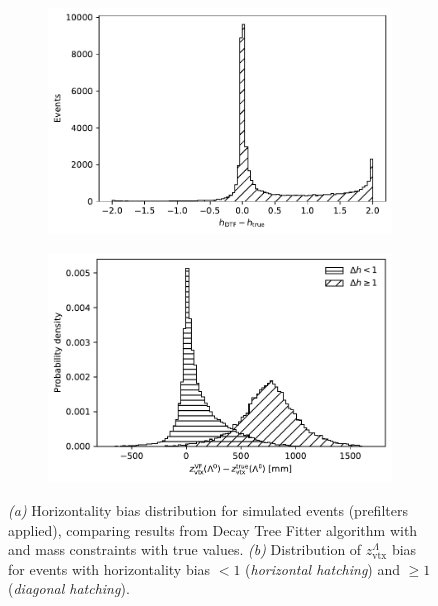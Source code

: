 \begin{figure}[t]
	\centering
	\begin{subfigure}{.45\textwidth}
		\includegraphics[width=\textwidth]{graphics/04-event_selection/Lambda_horizontality_bias.pdf}
		\caption{}
		\label{fig:4:horizontality_bias}
	\end{subfigure}
	\begin{subfigure}{.45\textwidth}
		\includegraphics[width=\textwidth]{graphics/04-event_selection/lambda_endvertex_z_bias_vs_horizontality_bias.pdf}
		\caption{}
		\label{fig:4:lz_endvertex_bias_vs_horizontality_bias}
	\end{subfigure}
	\caption{\textit{(a)} Horizontality bias distribution for simulated \demonstratorshort events (prefilters applied), comparing results from Decay Tree Fitter algorithm with \jpsi and \lz mass constraints with true values. \textit{(b)} Distribution of $z_\text{vtx}^\Lambda$ bias for events with horizontality bias $<1$ (\textit{horizontal hatching}) and $\geq 1$ (\textit{diagonal hatching}).}
\end{figure}

